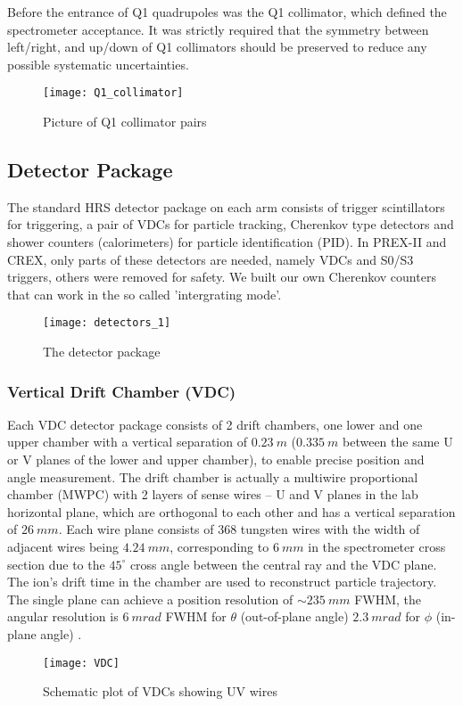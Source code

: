 Before the entrance of Q1 quadrupoles was the Q1 collimator, which defined
the spectrometer acceptance. It was strictly required that the symmetry between
left/right, and up/down of Q1 collimators should be preserved to reduce any
possible systematic uncertainties.
\begin{figure}[h!]
    \centering
    \texttt{[image: Q1\_collimator]}
    \caption{Picture of Q1 collimator pairs}
\end{figure}
\subsection{Detector Package}
The standard HRS detector package on each arm consists of trigger scintillators for
triggering, a pair of VDCs for particle tracking, Cherenkov type detectors and
shower counters (calorimeters) for particle identification (PID). In PREX-II
and CREX, only parts of these detectors are needed, namely VDCs and S0/S3 triggers,
others were removed for safety. We built our own Cherenkov counters that can 
work in the so called 'intergrating mode'.
\begin{figure}[h!]
    \centering
    \texttt{[image: detectors\_1]}
    \caption{The detector package}
    \label{fig:detectors}
\end{figure}

\subsubsection{Vertical Drift Chamber (VDC)}
Each VDC detector package consists of 2 drift chambers, one lower and one upper
chamber with a vertical separation of $0.23\ m$ ($0.335\ m$ between the same
U or V planes of the lower and upper chamber), to enable precise position and angle measurement. 
The drift chamber is actually a multiwire proportional chamber (MWPC) with 2 
layers of sense wires -- U and V planes in the lab horizontal plane, which are 
orthogonal to each other and has a vertical separation of $26\ mm$. 
Each wire plane consists of 368 tungsten wires with the width of adjacent wires 
being $4.24\ mm$, corresponding to $6\ mm$ in the spectrometer cross section due to the $45^\circ$
cross angle between the central ray and the VDC plane. The ion's drift time in 
the chamber are used to reconstruct particle trajectory. The single plane can
achieve a position resolution of $\sim 235\ mm$ FWHM, the angular resolution
is $6\ mrad$ FWHM for $\theta$ (out-of-plane angle) $2.3\ mrad$ for $\phi$ (in-plane
angle) \cite{FISSUM2001108}.
\begin{figure}[h!]
    \centering
    \texttt{[image: VDC]}
    \caption{Schematic plot of VDCs showing UV wires \cite{FISSUM2001108}}
\end{figure}

